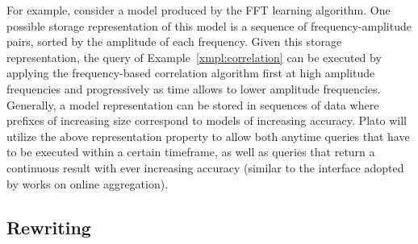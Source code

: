 For example, consider a model produced by the FFT learning algorithm. One possible storage representation of this model is a sequence of frequency-amplitude pairs, sorted by the amplitude of each frequency. Given this storage representation, the query of Example~\ref{xmpl:correlation} can be executed by applying the frequency-based correlation algorithm first at high amplitude frequencies and progressively as time allows to lower amplitude frequencies. Generally, a model representation can be stored in sequences of data where prefixes of increasing size correspond to models of increasing accuracy. Plato will utilize the above representation property to allow both anytime queries that have to be executed within a certain timeframe, as well as queries that return a continuous result with ever increasing accuracy (similar to the interface adopted by works on online aggregation). 




\subsection{Rewriting}
